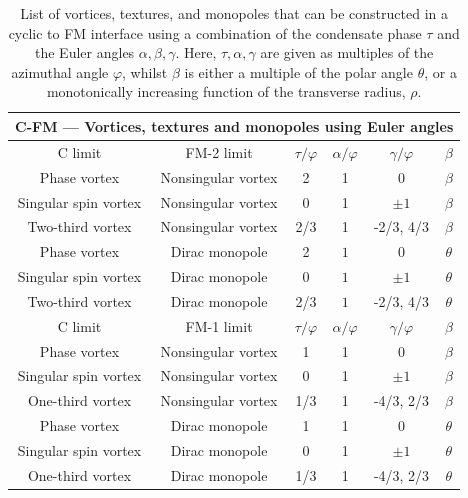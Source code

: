 \begin{table}
    \centering
    \begin{tabular}{cccccc}
        \toprule
        \multicolumn{6}{c}{C-FM --- Vortices, textures and monopoles using Euler
            angles} \\
        \midrule
        C limit & FM-2 limit &  \(\tau/\varphi\) & \(\alpha/\varphi\)
            & \(\gamma/\varphi\) & \(\beta\) \\
        \midrule
        Phase vortex & Nonsingular vortex & 2 & 1 & 0 & \(\beta\) \\ 
        Singular spin vortex & Nonsingular vortex & 0 & 1 & \(\pm 1\)
            & \(\beta\) \\ 
        Two-third vortex & Nonsingular vortex & 2/3 & 1 & -2/3, 4/3
            & \(\beta\) \\
        Phase vortex & Dirac monopole & 2 & \(1\) & 0 & \(\theta\) \\ 
        Singular spin vortex & Dirac monopole & 0 & \( 1\) & \(\pm 1\)
            & \(\theta\) \\ 
        Two-third vortex & Dirac monopole & 2/3 & \( 1\) & -2/3, 4/3
            & \(\theta\) \\
        \bottomrule
        \midrule
        C limit & FM-1 limit &  \(\tau/\varphi\) & \(\alpha/\varphi\)
            & \(\gamma/\varphi\) & \(\beta\) \\
        \midrule
        Phase vortex & Nonsingular vortex & 1 & 1 & 0 & \(\beta\) \\ 
        Singular spin vortex & Nonsingular vortex & 0 & 1 & \(\pm 1\)
            & \(\beta\) \\ 
        One-third vortex & Nonsingular vortex & 1/3 & 1 & -4/3, 2/3
            & \(\beta\) \\
        Phase vortex & Dirac monopole & 1 & 1 & 0 & \(\theta\) \\ 
        Singular spin vortex & Dirac monopole & 0 & 1 & \(\pm 1\) & \(\theta\)\\ 
        One-third vortex & Dirac monopole & 1/3 & 1 & -4/3, 2/3 & \(\theta\) \\
        \bottomrule
    \end{tabular}
    \caption{\label{tab: C-FM-other}List of vortices, textures, and monopoles
    that can be constructed in a cyclic to FM interface using a combination
    of the condensate phase \(\tau\) and the Euler angles \(\alpha, \beta,
    \gamma\).
    Here, \(\tau, \alpha, \gamma\) are given as multiples of the azimuthal angle
    \(\varphi\), whilst \(\beta\) is either a multiple of the polar angle
    \(\theta\), or a monotonically increasing function of the transverse radius,
    \(\rho\).}
\end{table}

